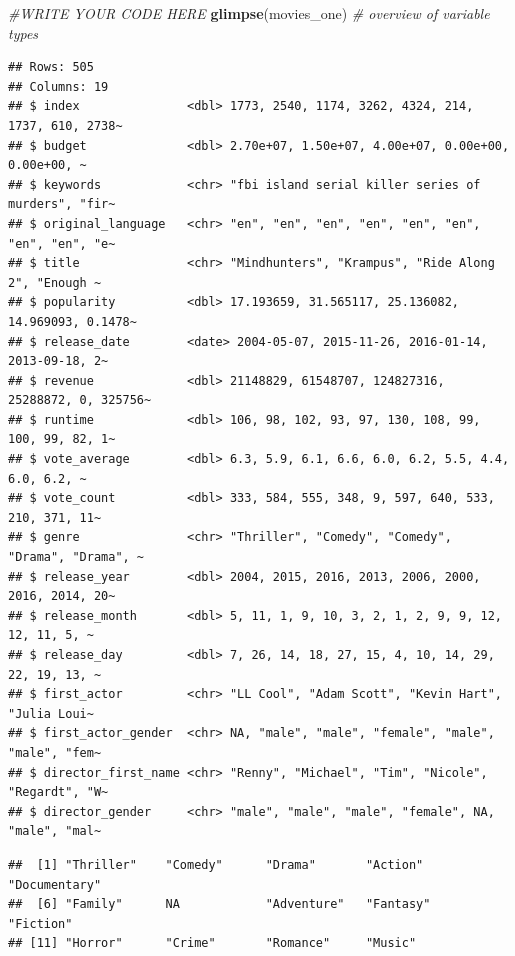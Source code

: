 \documentclass[
]{article}
\newenvironment{Shaded}{\begin{snugshade}}{\end{snugshade}}
\newcommand{\CommentTok}[1]{\textcolor[rgb]{0.56,0.35,0.01}{\textit{#1}}}
\newcommand{\FunctionTok}[1]{\textcolor[rgb]{0.13,0.29,0.53}{\textbf{#1}}}
\newcommand{\NormalTok}[1]{#1}
\newcommand{\SpecialCharTok}[1]{\textcolor[rgb]{0.81,0.36,0.00}{\textbf{#1}}}
\begin{document}
\begin{Shaded}
\begin{Highlighting}[]
\CommentTok{\#WRITE YOUR CODE HERE}
\FunctionTok{glimpse}\NormalTok{(movies\_one)                 }\CommentTok{\# overview of variable types}
\end{Highlighting}
\end{Shaded}

\begin{verbatim}
## Rows: 505
## Columns: 19
## $ index               <dbl> 1773, 2540, 1174, 3262, 4324, 214, 1737, 610, 2738~
## $ budget              <dbl> 2.70e+07, 1.50e+07, 4.00e+07, 0.00e+00, 0.00e+00, ~
## $ keywords            <chr> "fbi island serial killer series of murders", "fir~
## $ original_language   <chr> "en", "en", "en", "en", "en", "en", "en", "en", "e~
## $ title               <chr> "Mindhunters", "Krampus", "Ride Along 2", "Enough ~
## $ popularity          <dbl> 17.193659, 31.565117, 25.136082, 14.969093, 0.1478~
## $ release_date        <date> 2004-05-07, 2015-11-26, 2016-01-14, 2013-09-18, 2~
## $ revenue             <dbl> 21148829, 61548707, 124827316, 25288872, 0, 325756~
## $ runtime             <dbl> 106, 98, 102, 93, 97, 130, 108, 99, 100, 99, 82, 1~
## $ vote_average        <dbl> 6.3, 5.9, 6.1, 6.6, 6.0, 6.2, 5.5, 4.4, 6.0, 6.2, ~
## $ vote_count          <dbl> 333, 584, 555, 348, 9, 597, 640, 533, 210, 371, 11~
## $ genre               <chr> "Thriller", "Comedy", "Comedy", "Drama", "Drama", ~
## $ release_year        <dbl> 2004, 2015, 2016, 2013, 2006, 2000, 2016, 2014, 20~
## $ release_month       <dbl> 5, 11, 1, 9, 10, 3, 2, 1, 2, 9, 9, 12, 12, 11, 5, ~
## $ release_day         <dbl> 7, 26, 14, 18, 27, 15, 4, 10, 14, 29, 22, 19, 13, ~
## $ first_actor         <chr> "LL Cool", "Adam Scott", "Kevin Hart", "Julia Loui~
## $ first_actor_gender  <chr> NA, "male", "male", "female", "male", "male", "fem~
## $ director_first_name <chr> "Renny", "Michael", "Tim", "Nicole", "Regardt", "W~
## $ director_gender     <chr> "male", "male", "male", "female", NA, "male", "mal~
\end{verbatim}

\begin{Shaded}
\end{Shaded}

\begin{verbatim}
##  [1] "Thriller"    "Comedy"      "Drama"       "Action"      "Documentary"
##  [6] "Family"      NA            "Adventure"   "Fantasy"     "Fiction"    
## [11] "Horror"      "Crime"       "Romance"     "Music"
\end{verbatim}
\end{document}
